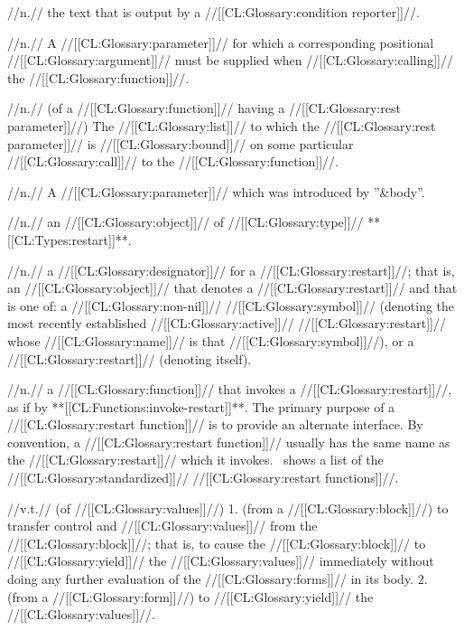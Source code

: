  //n.// the text that is output by a //[[CL:Glossary:condition reporter]]//.

 //n.// A //[[CL:Glossary:parameter]]// for which a corresponding positional //[[CL:Glossary:argument]]// must be supplied when //[[CL:Glossary:calling]]// the //[[CL:Glossary:function]]//.

 //n.// (of a //[[CL:Glossary:function]]// having a //[[CL:Glossary:rest parameter]]//) The //[[CL:Glossary:list]]// to which the //[[CL:Glossary:rest parameter]]// is //[[CL:Glossary:bound]]// on some particular //[[CL:Glossary:call]]// to the //[[CL:Glossary:function]]//.

 //n.// A //[[CL:Glossary:parameter]]// which was introduced by ''&body''.

 //n.// an //[[CL:Glossary:object]]// of //[[CL:Glossary:type]]// **[[CL:Types:restart]]**.

 //n.// a //[[CL:Glossary:designator]]// for a //[[CL:Glossary:restart]]//; that is, an //[[CL:Glossary:object]]// that denotes a //[[CL:Glossary:restart]]// and that is one of: a //[[CL:Glossary:non-nil]]// //[[CL:Glossary:symbol]]// (denoting the most recently established //[[CL:Glossary:active]]// //[[CL:Glossary:restart]]// whose //[[CL:Glossary:name]]// is that //[[CL:Glossary:symbol]]//), or a //[[CL:Glossary:restart]]// (denoting itself).

 //n.// a //[[CL:Glossary:function]]// that invokes a //[[CL:Glossary:restart]]//, as if by **[[CL:Functions:invoke-restart]]**. The primary purpose of a //[[CL:Glossary:restart function]]// is to provide an alternate interface. By convention, a //[[CL:Glossary:restart function]]// usually has the same name as the //[[CL:Glossary:restart]]// which it invokes. \Thenextfigure\ shows a list of the //[[CL:Glossary:standardized]]// //[[CL:Glossary:restart functions]]//.


 //v.t.// (of //[[CL:Glossary:values]]//) 1. (from a //[[CL:Glossary:block]]//) to transfer control and //[[CL:Glossary:values]]// from the //[[CL:Glossary:block]]//; that is, to cause the //[[CL:Glossary:block]]// to //[[CL:Glossary:yield]]// the //[[CL:Glossary:values]]// immediately without doing any further evaluation of the //[[CL:Glossary:forms]]// in its body. 2. (from a //[[CL:Glossary:form]]//) to //[[CL:Glossary:yield]]// the //[[CL:Glossary:values]]//.

